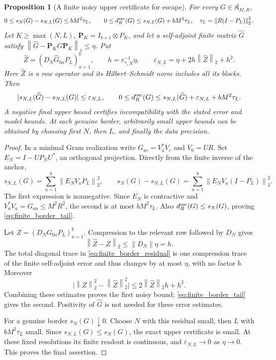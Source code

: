 \documentclass[11pt,a4paper]{amsart}
\numberwithin{equation}{section}
\newtheorem{proposition}[theorem]{Proposition}
\theoremstyle{definition}
\theoremstyle{remark}
\newcommand{\norm}[1]{\left\lVert#1\right\rVert}
\begin{document}
\begin{proposition}[A finite noisy upper certificate for escape]\label{prop:finite_escape_certificate}
For every $G\in\mathfrak K_{M,R}$,
\begin{equation}\label{eq:finite_border_tail}
 0\le s_N(G)-s_{N,L}(G)\le bM^2\tau_L,\qquad
 0\le d_R^{\rm esc}(G)\le s_{N,L}(G)+bM^2\tau_L,
 \quad \tau_L=\norm{R(I-P_L)}_2^2.
\end{equation}
Let $K\ge\max(N,L)$, $\boldsymbol P_K=I_{b+1}\otimes P_K$, and let a self-adjoint finite matrix $\widehat G$ satisfy
$\norm{\widehat G-\boldsymbol P_KG\boldsymbol P_K}_1\le\eta$.
Put
\[
 \widehat Z=(D_N\widehat G_{0a}P_L)_{a=1}^b,\qquad
 h=r_{*,N}^{-1}\eta,\qquad
 \varepsilon_{N,L}=\eta+2h\norm{\widehat Z}_2+h^2.
\]
Here $\widehat Z$ is a row operator and its Hilbert--Schmidt norm includes all its blocks. Then
\begin{equation}\label{eq:finite_noisy_escape}
 |s_{N,L}(\widehat G)-s_{N,L}(G)|\le\varepsilon_{N,L},\qquad
 0\le d_R^{\rm esc}(G)
 \le s_{N,L}(\widehat G)+\varepsilon_{N,L}+bM^2\tau_L.
\end{equation}
A negative final upper bound certifies incompatibility with the stated error and model bounds. At each genuine border, arbitrarily small upper bounds can be obtained by choosing first $N$, then $L$, and finally the data precision.
\end{proposition}
\begin{proof}
In a minimal Gram realization write $G_{ac}=V_a^*V_c$ and $V_0=UR$. Set $E_N=I-UP_NU^*$, an orthogonal projection. Directly from the finite inverse of the anchor,
\[
 s_{N,L}(G)=\sum_{a=1}^b\norm{E_NV_aP_L}_2^2,\qquad
 s_N(G)-s_{N,L}(G)=\sum_{a=1}^b\norm{E_NV_a(I-P_L)}_2^2.
\]
The first expression is nonnegative. Since $E_N$ is contractive and $V_a^*V_a=G_{aa}\le M^2R^2$, the second is at most $bM^2\tau_L$. Also $d_R^{\rm esc}(G)\le s_N(G)$, proving \eqref{eq:finite_border_tail}.

Let $Z=(D_NG_{0a}P_L)_{a=1}^b$. Compression to the relevant row followed by $D_N$ gives
\[
 \norm{\widehat Z-Z}_2\le\norm{D_N}\eta=h.
\]
The total diagonal trace in \eqref{eq:finite_border_residual} is one compression trace of the finite self-adjoint error and thus changes by at most $\eta$, with no factor $b$. Moreover
\[
 \big|\norm{Z}_2^2-\norm{\widehat Z}_2^2\big|
 \le2\norm{\widehat Z}_2h+h^2.
\]
Combining these estimates proves the first noisy bound; \eqref{eq:finite_border_tail} gives the second. Positivity of $\widehat G$ is not needed for these error estimates.

For a genuine border $s_N(G)\downarrow0$. Choose $N$ with this residual small, then $L$ with $bM^2\tau_L$ small. Since $s_{N,L}(G)\le s_N(G)$, the exact upper certificate is small. At these fixed resolutions its finite readout is continuous, and $\varepsilon_{N,L}\to0$ as $\eta\to0$. This proves the final assertion.
\end{proof}
\end{document}
